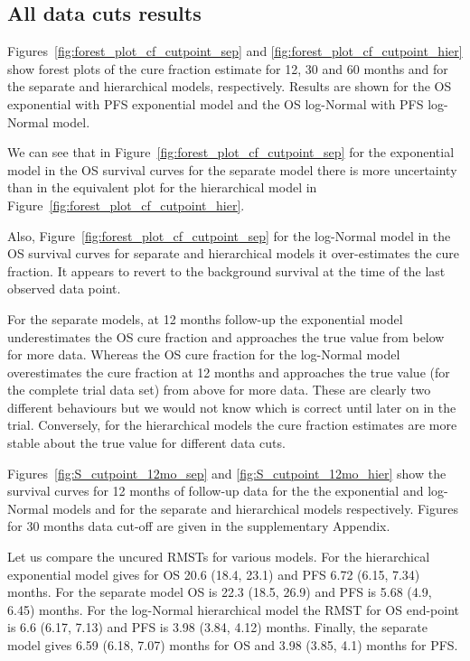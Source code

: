 \documentclass[AMA,STIX1COL]{WileyNJD-v2}
\begin{document}
%
\subsection{All data cuts results}
Figures~\ref{fig:forest_plot_cf_cutpoint_sep} and \ref{fig:forest_plot_cf_cutpoint_hier} show forest plots of the cure fraction estimate for 12, 30 and 60 months and for the separate and hierarchical models, respectively.
Results are shown for the OS exponential with PFS exponential model and the OS log-Normal with PFS log-Normal model.

We can see that in Figure~\ref{fig:forest_plot_cf_cutpoint_sep} for the exponential model in the OS survival curves for the separate model there is more uncertainty than in the equivalent plot for the hierarchical model in Figure~\ref{fig:forest_plot_cf_cutpoint_hier}.

Also, Figure~\ref{fig:forest_plot_cf_cutpoint_sep} for the log-Normal model in the OS survival curves for separate and hierarchical models it over-estimates the cure fraction. It appears to revert to the background survival at the time of the last observed data point.


For the separate models, at 12 months follow-up the exponential model underestimates the OS cure fraction and approaches the true value from below for more data.
Whereas the OS cure fraction for the log-Normal model overestimates the cure fraction at 12 months and approaches the true value (for the complete trial data set) from above for more data.
These are clearly two different behaviours but we would not know which is correct until later on in the trial.
Conversely, for the hierarchical models the cure fraction estimates are more stable about the true value for different data cuts.


Figures~\ref{fig:S_cutpoint_12mo_sep} and \ref{fig:S_cutpoint_12mo_hier} show
the survival curves for 12 months of follow-up data for the the exponential and log-Normal models and for the separate and hierarchical models respectively.
Figures for 30 months data cut-off are given in the supplementary Appendix.

Let us compare the uncured RMSTs for various models.
For the hierarchical exponential model gives for OS 20.6 (18.4, 23.1) and PFS 6.72 (6.15, 7.34) months.
For the separate model OS is 22.3 (18.5, 26.9) and PFS is 5.68 (4.9, 6.45) months.
For the log-Normal hierarchical model the RMST for OS end-point is 6.6 (6.17, 7.13) and PFS is 3.98 (3.84, 4.12) months.
Finally, the separate model gives 6.59 (6.18, 7.07) months for OS and 3.98 (3.85, 4.1) months for PFS.
\end{document}
